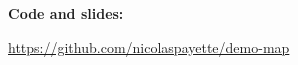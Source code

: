 \documentclass{beamer}
\newcommand{\hl}[1]{\textcolor{OxfordBlue}{\textbf{#1}}}
\begin{document}
{
\begin{frame}[plain]
\end{frame}}

\begin{frame}
  \begin{center}
    \hl{\huge Code and slides:}\par\vskip1cm
    \url{https://github.com/nicolaspayette/demo-map}
  \end{center}
\end{frame}
\end{document}
